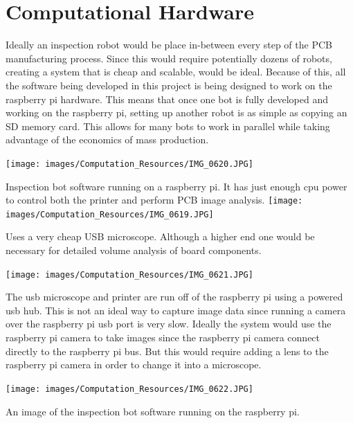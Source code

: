 \documentclass[12pt]{article}
\begin{document}
\maketitle

\section{Computational Hardware}

Ideally an inspection robot would be place in-between every step of the PCB manufacturing process. Since this would require potentially dozens of robots, creating a system that is cheap and scalable, would be ideal.  Because of this, all the software being developed in this project is being designed to work on the raspberry pi hardware.  This means that once one bot is fully developed and working on the raspberry pi, setting up another robot is as simple as copying an SD memory card. This allows for many bots to work in parallel while taking advantage of the economics of mass production. 

\newpage
\texttt{[image: images/Computation\_Resources/IMG\_0620.JPG]}

Inspection bot software running on a raspberry pi.  It has just enough cpu power to control both the printer and perform PCB image analysis.  
\newpage
\texttt{[image: images/Computation\_Resources/IMG\_0619.JPG]}

Uses a very cheap USB microscope.  Although a higher end one would be necessary for detailed volume analysis of board components. 

\newpage
\texttt{[image: images/Computation\_Resources/IMG\_0621.JPG]}

The usb microscope and printer are run off of the raspberry pi using a powered usb hub.  This is not an ideal way to capture image data since running a camera over the raspberry pi usb port is very slow.  Ideally the system would use the raspberry pi camera to take images since the raspberry pi camera connect directly to the raspberry pi bus.  But this would require adding a lens to the raspberry pi camera in order to change it into a microscope.   

\newpage
\texttt{[image: images/Computation\_Resources/IMG\_0622.JPG]}

An image of the inspection bot software running on the raspberry pi. 
\end{document}
